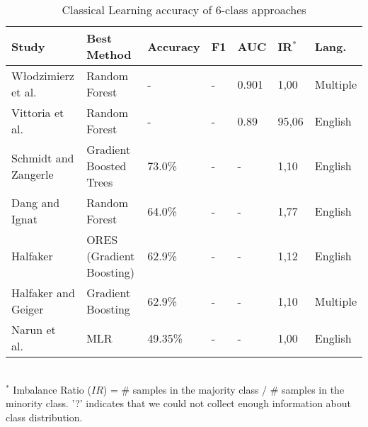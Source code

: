 \begin{table}[ht]
    \caption{Classical Learning accuracy of 6-class approaches }
    \label{tab:CL_performance_6class}
    \centering
    \begin{tabular}{l l l l l l l}
        \toprule
        \textbf{Study} & \textbf{Best Method} & \textbf{Accuracy} & \textbf{F1} & \textbf{AUC} & \textbf{IR$^*$} & \textbf{Lang.} \\ 
        \midrule
        Włodzimierz et al.~\cite{Lewoniewski2016_lr18} & Random Forest & - & - & 0.901 & 1,00 & Multiple \\
        Vittoria et al.~\cite{Cozza2016_lr92} & Random Forest & - & - & 0.89 & 95,06 & English \\
        Schmidt and Zangerle~\cite{Schmidt2019_lr78} & Gradient Boosted Trees & 73.0\% & - & - & 1,10 & English \\
        Dang and Ignat~\cite{Dang2016_lr16} & Random Forest & 64.0\% & - & - & 1,77 & English \\
        Halfaker~\cite{Halfaker2017_lr22} & ORES (Gradient Boosting) & 62.9\% & - & - & 1,12 & English \\
        Halfaker and Geiger~\cite{Halfaker2020_lr1055} & Gradient Boosting & 62.9\% & - & - & 1,10 & Multiple \\
        Narun et al.~\cite{Raman2020_lr64} & MLR & 49.35\% & - & - & 1,00 & English \\
        \bottomrule
    \end{tabular}
    \\ \vspace{0.1cm}
    \footnotesize
    $^*$ Imbalance Ratio ($IR$) = \# samples in the majority class / \# samples in the minority class. '?' indicates that we could not collect enough information about class distribution.
\end{table}